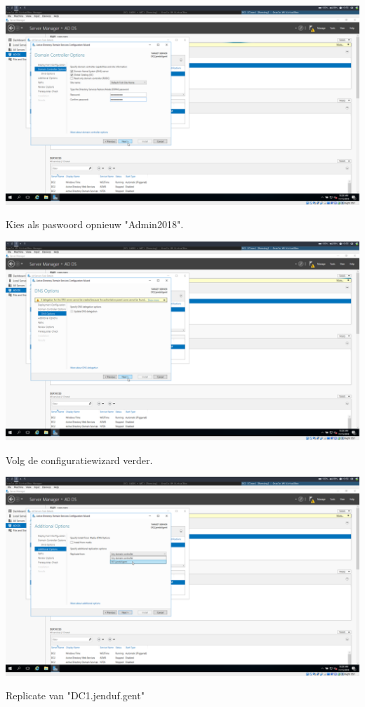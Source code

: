 \documentclass[a4paper]{article}
\begin{document}
\begin{center}
	\includegraphics[width=15cm]{Pictures/DC2/ADDS/1542307813.png}
	
	Kies als paswoord opnieuw "Admin2018".
\end{center}
\begin{center}
	\includegraphics[width=15cm]{Pictures/DC2/ADDS/1542307817.png}
	
	Volg de configuratiewizard verder.
\end{center}
\begin{center}
	\includegraphics[width=15cm]{Pictures/DC2/ADDS/1542307822.png}
	
	Replicate van "DC1.jenduf.gent"
\end{center}
\end{document}
